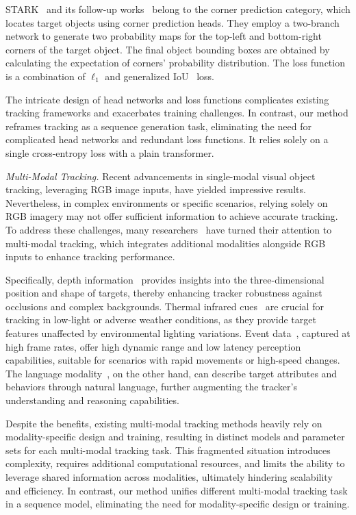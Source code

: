 STARK~\cite{Stark} and its follow-up works~\cite{CSWinTT,mixformer,simtrack} belong to the corner prediction category, which locates target objects using corner prediction heads. They employ a two-branch network to generate two probability maps for the top-left and bottom-right corners of the target object.  The final object bounding boxes are obtained by calculating the expectation of corners' probability distribution.  The loss function is a combination of $\ell_1$ and generalized IoU~\cite{GIoU} loss.

The intricate design of head networks and loss functions complicates existing tracking frameworks and exacerbates training challenges. In contrast, our method reframes tracking as a sequence generation task, eliminating the need for complicated head networks and redundant loss functions. It relies solely on a single cross-entropy loss with a plain transformer.

\textit{Multi-Modal Tracking.}
Recent advancements in single-modal visual object tracking, leveraging RGB image inputs, have yielded impressive results. Nevertheless, in complex environments or specific scenarios, relying solely on RGB imagery may not offer sufficient information to achieve accurate tracking. To address these challenges, many researchers~\cite{ca3dms, apfnet, jmmac, cmpp, JointNLT, DecoupleTNL, SNLT, protrack, vipt} have turned their attention to multi-modal tracking, which integrates additional modalities alongside RGB inputs to enhance tracking performance. 

Specifically, depth information~\cite{rgbd1k, depthtrack} provides insights into the three-dimensional position and shape of targets, thereby enhancing tracker robustness against occlusions and complex backgrounds. Thermal infrared cues~\cite{lasher, rgbt234} are crucial for tracking in low-light or adverse weather conditions, as they provide target features unaffected by environmental lighting variations. Event data~\cite{visevent, COESOT}, captured at high frame rates, offer high dynamic range and low latency perception capabilities, suitable for scenarios with rapid movements or high-speed changes. The language modality~\cite{TNL2K, TNLS}, on the other hand, can describe target attributes and behaviors through natural language, further augmenting the tracker's understanding and reasoning capabilities.

Despite the benefits, existing multi-modal tracking methods heavily rely on modality-specific design and training, resulting in distinct models and parameter sets for each multi-modal tracking task. This fragmented situation introduces complexity, requires additional computational resources, and limits the ability to leverage shared information across modalities, ultimately hindering scalability and efficiency. In contrast, our method unifies different multi-modal tracking task in a sequence model, eliminating the need for modality-specific design or training.

